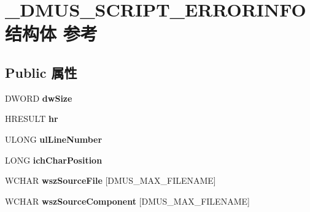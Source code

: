 \hypertarget{struct___d_m_u_s___s_c_r_i_p_t___e_r_r_o_r_i_n_f_o}{}\section{\+\_\+\+D\+M\+U\+S\+\_\+\+S\+C\+R\+I\+P\+T\+\_\+\+E\+R\+R\+O\+R\+I\+N\+F\+O结构体 参考}
\label{struct___d_m_u_s___s_c_r_i_p_t___e_r_r_o_r_i_n_f_o}
\subsection*{Public 属性}
\begin{DoxyCompactItemize}
\item 
\mbox{\label{struct___d_m_u_s___s_c_r_i_p_t___e_r_r_o_r_i_n_f_o_a5335f0cdd3845c92dd9ad3aa46ba463d}} 
D\+W\+O\+RD {\bfseries dw\+Size}
\item 
\mbox{\label{struct___d_m_u_s___s_c_r_i_p_t___e_r_r_o_r_i_n_f_o_a6c57033f3a2428a82127a565f5ee78f5}} 
H\+R\+E\+S\+U\+LT {\bfseries hr}
\item 
\mbox{\label{struct___d_m_u_s___s_c_r_i_p_t___e_r_r_o_r_i_n_f_o_aecb559a2065add633ffa29f45ba39902}} 
U\+L\+O\+NG {\bfseries ul\+Line\+Number}
\item 
\mbox{\label{struct___d_m_u_s___s_c_r_i_p_t___e_r_r_o_r_i_n_f_o_a7f11654c9016cc4e6d4ecd6cbda55758}} 
L\+O\+NG {\bfseries ich\+Char\+Position}
\item 
\mbox{\label{struct___d_m_u_s___s_c_r_i_p_t___e_r_r_o_r_i_n_f_o_a33798cea5b4b2144cf857929373b5fa4}} 
W\+C\+H\+AR {\bfseries wsz\+Source\+File} \mbox{[}D\+M\+U\+S\+\_\+\+M\+A\+X\+\_\+\+F\+I\+L\+E\+N\+A\+ME\mbox{]}
\item 
\mbox{\label{struct___d_m_u_s___s_c_r_i_p_t___e_r_r_o_r_i_n_f_o_a4b0cfa322dc191307b2429287c548b4a}} 
W\+C\+H\+AR {\bfseries wsz\+Source\+Component} \mbox{[}D\+M\+U\+S\+\_\+\+M\+A\+X\+\_\+\+F\+I\+L\+E\+N\+A\+ME\mbox{]}

\end{DoxyCompactItemize}
